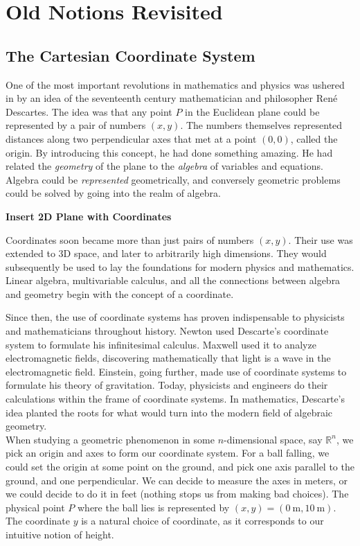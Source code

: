 %
%
% 
%
\chapter{Old Notions Revisited}
\section{The Cartesian Coordinate System} %
\label{sec:Cartesian}
	
	
	
	One of the most important revolutions in mathematics and physics was ushered in by an idea of the seventeenth century mathematician and philosopher Ren\'{e} Descartes. The idea was that any point $P$ in the Euclidean plane could be represented by a pair of numbers $(x,y)$. The numbers themselves represented distances along two perpendicular axes that met at a point $(0,0)$, called the origin. By introducing this concept, he had done something amazing. He had related the \emph{geometry} of the plane to the \emph{algebra} of variables and equations. Algebra could be \emph{represented} geometrically, and conversely geometric problems could be solved by going into the realm of algebra. 
	
	\textbf{Insert 2D Plane with Coordinates}
	
	Coordinates soon became more than just pairs of numbers $(x,y)$. Their use was extended to 3D space, and later to arbitrarily high dimensions. They would subsequently be used to lay the foundations for modern physics and mathematics. Linear algebra, multivariable calculus, and all the connections between algebra and geometry begin with the concept of a coordinate.
	
	Since then, the use of coordinate systems has proven indispensable to physicists and mathematicians throughout history. Newton used Descarte's coordinate system to formulate his infinitesimal calculus. Maxwell used it to analyze electromagnetic fields, discovering mathematically that light is a wave in the electromagnetic field. Einstein, going further, made use of coordinate systems to formulate his theory of gravitation. Today, physicists and engineers do their calculations within the frame of coordinate systems. In mathematics, Descarte's idea planted the roots for what would turn into the modern field of algebraic geometry. \\
	
	When studying a geometric phenomenon in some $n$-dimensional space, say $\mathbb{R}^n$, we pick an origin and axes to form our coordinate system. For a ball falling, we could set the origin at some point on the ground, and pick one axis parallel to the ground, and one perpendicular. We can decide to measure the axes in meters, or we could decide to do it in feet (nothing stops us from making bad choices). The physical point $P$ where the ball lies is represented by $(x,y)=(0~ \mathrm m,10~ \mathrm m)$. The coordinate $y$ is a natural choice of coordinate, as it corresponds to our intuitive notion of height. 
	
